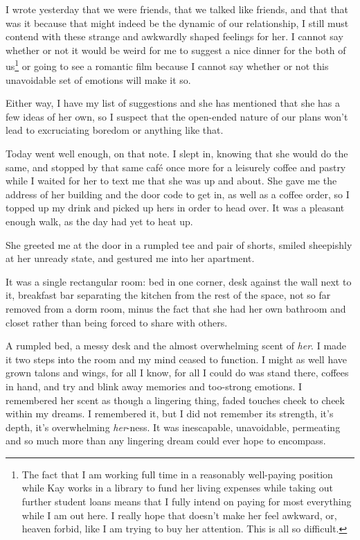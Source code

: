 I wrote yesterday that we were friends, that we talked like friends, and that that was it because that might indeed be the dynamic of our relationship, I still must contend with these strange and awkwardly shaped feelings for her. I cannot say whether or not it would be weird for me to suggest a nice dinner for the both of us\footnote{The fact that I am working full time in a reasonably well-paying position while Kay works in a library to fund her living expenses while taking out further student loans means that I fully intend on paying for most everything while I am out here. I really hope that doesn't make her feel awkward, or, heaven forbid, like I am trying to buy her attention. This is all so difficult.} or going to see a romantic film because I cannot say whether or not this unavoidable set of emotions will make it so.

Either way, I have my list of suggestions and she has mentioned that she has a few ideas of her own, so I suspect that the open-ended nature of our plans won't lead to excruciating boredom or anything like that.

Today went well enough, on that note. I slept in, knowing that she would do the same, and stopped by that same café once more for a leisurely coffee and pastry while I waited for her to text me that she was up and about. She gave me the address of her building and the door code to get in, as well as a coffee order, so I topped up my drink and picked up hers in order to head over. It was a pleasant enough walk, as the day had yet to heat up.

She greeted me at the door in a rumpled tee and pair of shorts, smiled sheepishly at her unready state, and gestured me into her apartment.

It was a single rectangular room: bed in one corner, desk against the wall next to it, breakfast bar separating the kitchen from the rest of the space, not so far removed from a dorm room, minus the fact that she had her own bathroom and closet rather than being forced to share with others.

A rumpled bed, a messy desk and the almost overwhelming scent of \emph{her}. I made it two steps into the room and my mind ceased to function. I might as well have grown talons and wings, for all I know, for all I could do was stand there, coffees in hand, and try and blink away memories and too-strong emotions. I remembered her scent as though a lingering thing, faded touches cheek to cheek within my dreams. I remembered it, but I did not remember its strength, it's depth, it's overwhelming \emph{her}-ness. It was inescapable, unavoidable, permeating and so much more than any lingering dream could ever hope to encompass.

